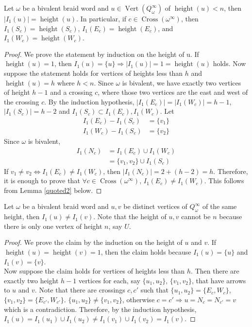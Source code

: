 \begin{lemma}\label{quoted4}
Let $\omega$ be a bivalent braid word and $u\in \operatorname{Vert}(Q_\omega^\infty)$ of $\operatorname{height}(u)<n$, then $|I_1(u)|=\operatorname{height}(u)$. In particular, if $c\in \operatorname{Cross}(\omega^\infty)$, then $I_1(S_c)=\operatorname{height}(S_c)$, $I_1(E_c)=\operatorname{height}(E_c)$, and $I_1(W_c)=\operatorname{height}(W_c)$.
\end{lemma}
\begin{proof}
We prove the statement by induction on the height of u. If $\operatorname{height}(u) = 1$, then $I_1(u) = \{u \} \Rightarrow |I_1(u)| = 1 = \operatorname{height}(u)$ holds. Now suppose the statement holds for vertices of heights less than $h$ and $\operatorname{height}(u) =h$ where $h<n$. Since $\omega$ is bivalent, we have exactly two vertices of height $h-1$ and a crossing $c$, where those two vertices are the east and west of the crossing $c$. By the induction hypothesis, $|I_1(E_c)| = |I_1(W_c)| = h-1$, $|I_1(S_c)| = h-2$ and $I_1(S_c)\subset I_1(E_c),I_1(W_c)$. Let
\begin{align*}
	I_1(E_c) - I_1(S_c) &= \{v_1\} \\
	I_1(W_c) - I_1(S_c) &= \{v_2\}
\end{align*}
Since $\omega$ is bivalent, 
\begin{align*}
	I_1(N_c) &= I_1(E_c) \cup I_1(W_c) \\
			 &= \{v_1, v_2\} \cup I_1(S_c)
\end{align*}
If $v_1 \neq v_2\Leftrightarrow I_1(E_c) \neq I_1(W_c)$, then $|I_1(N_c)| = 2 + (h-2) = h$. Therefore, it is enough to prove that $\forall c\in \operatorname{Cross}(\omega^\infty)$, $I_1(E_c) \neq I_1(W_c)$. This follows from Lemma \ref{quoted2} below.
\end{proof}

\begin{lemma}\label{quoted2}
Let $\omega$ be a bivalent braid word and $u,v$ be distinct vertices of $Q_\omega^\infty$ of the same height, then $I_1(u) \neq I_1(v)$. Note that the height of $u,v$ cannot be $n$ because there is only one vertex of height $n$, say $U$.
\end{lemma}
\begin{proof}
We prove the claim by the induction on the height of $u$ and $v$. If $\operatorname{height}(u) = \operatorname{height}(v) = 1$, then the claim holds because $I_1(u) = \{u\}$ and $I_1(v) = \{v\}$. \\
Now suppose the claim holds for vertices of heights less than $h$. Then there are exactly two height $h-1$ vertices for each, say $\{u_1,u_2\}$, $\{v_1,v_2\}$, that have arrows to $u$ and $v$. Note that there are crossings $c,c'$ such that $\{u_1,u_2\}=\{E_c,W_c\}$, $\{v_1,v_2\}=\{E_{c'},W_{c'}\}$. $\{u_1,u_2\}\neq\{v_1,v_2\}$, otherwise $c=c'\Rightarrow u=N_c=N_{c'}=v$ which is a contradiction. Therefore, by the induction hypothesis, $I_1(u) = I_1(u_1)\cup I_1(u_2)\neq I_1(v_1)\cup I_1(v_2) = I_1(v)$.
\end{proof}

